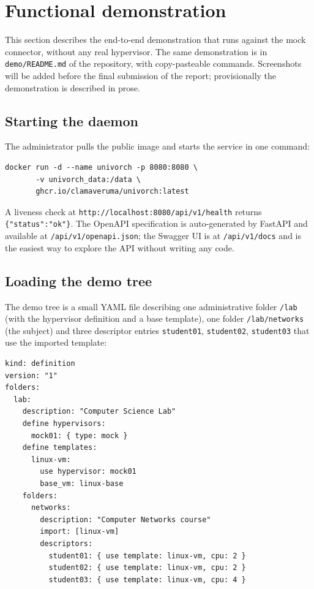 \section{Functional demonstration}
\label{sec:demo}

This section describes the end-to-end demonstration that runs
against the mock connector, without any real hypervisor. The same
demonstration is in \texttt{demo/README.md} of the repository, with
copy-pasteable commands. Screenshots will be added before the final
submission of the report; provisionally the demonstration is
described in prose.

\subsection{Starting the daemon}

The administrator pulls the public image and starts the service in
one command:

\begin{verbatim}
docker run -d --name univorch -p 8080:8080 \
       -v univorch_data:/data \
       ghcr.io/clamaveruma/univorch:latest
\end{verbatim}

A liveness check at \texttt{http://localhost:8080/api/v1/health}
returns \texttt{\{"status":"ok"\}}. The OpenAPI specification is
auto-generated by FastAPI and available at
\texttt{/api/v1/openapi.json}; the Swagger UI is at
\texttt{/api/v1/docs} and is the easiest way to explore the API
without writing any code.

\subsection{Loading the demo tree}

The demo tree is a small YAML file describing one administrative
folder \texttt{/lab} (with the hypervisor definition and a base
template), one folder \texttt{/lab/networks} (the subject) and
three descriptor entries \texttt{student01}, \texttt{student02},
\texttt{student03} that use the imported template:

\begin{verbatim}
kind: definition
version: "1"
folders:
  lab:
    description: "Computer Science Lab"
    define hypervisors:
      mock01: { type: mock }
    define templates:
      linux-vm:
        use hypervisor: mock01
        base_vm: linux-base
    folders:
      networks:
        description: "Computer Networks course"
        import: [linux-vm]
        descriptors:
          student01: { use template: linux-vm, cpu: 2 }
          student02: { use template: linux-vm, cpu: 2 }
          student03: { use template: linux-vm, cpu: 4 }
\end{verbatim}

